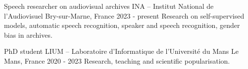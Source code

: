 
\begin{cventries}
	\cventry
		{Speech researcher on audiovisual archives}
		{INA -- Institut National de l'Audiovisuel}
		{Bry-sur-Marne, France}
		{2023 - present}
		{Research on self-supervised models, automatic speech recognition, speaker and speech recognition, gender bias in archives.}

	\cventry
		{PhD student}
		{LIUM -- Laboratoire d'Informatique de l'Université du Mans}
		{Le Mans, France}
		{2020 - 2023}
		{Research, teaching and scientific popularisation.}

\end{cventries}
